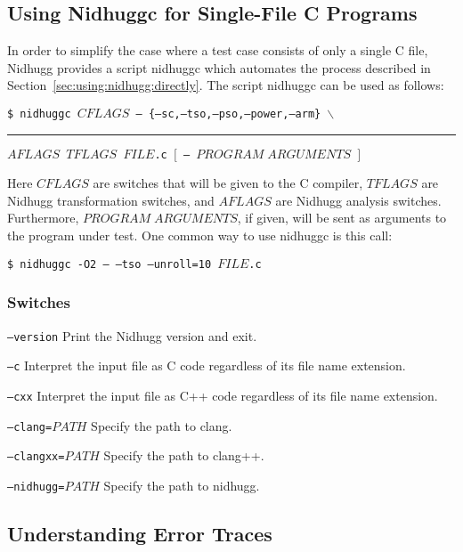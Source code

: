 \documentclass[a4paper]{article}
\begin{document}
\subsection{Using Nidhuggc for Single-File C Programs}\label{sec:using:nidhuggc}

In order to simplify the case where a test case consists of only a
single C file, Nidhugg provides a script \textsf{nidhuggc} which
automates the process described in
Section~\ref{sec:using:nidhugg:directly}. The script \textsf{nidhuggc}
can be used as follows:

\vspace{5pt}
\noindent
\texttt{\$ nidhuggc $CFLAGS$ -- \{--sc,--tso,--pso,--power,--arm\} $\backslash$}\\
\rule{20pt}{0pt}\texttt{$AFLAGS$ $TFLAGS$ $FILE$.c $[$ -- $PROGRAM\;ARGUMENTS$ $]$}

\vspace{5pt}\noindent
%
Here $CFLAGS$ are switches that will be given to the C compiler,
$TFLAGS$ are Nidhugg transformation switches, and $AFLAGS$ are Nidhugg
analysis switches. Furthermore, $PROGRAM\;ARGUMENTS$, if given, will
be sent as arguments to the program under test. One common way to use
\textsf{nidhuggc} is this call:

\vspace{5pt}
\noindent
\texttt{\$ nidhuggc -O2 -- --tso --unroll=10 $FILE$.c}

\subsubsection{Switches}

\begin{description}
\item{\texttt{--version}}
%
  Print the Nidhugg version and exit.
\item{\texttt{--c}}
%
  Interpret the input file as C code regardless of its file name
  extension.
\item{\texttt{--cxx}}
%
  Interpret the input file as C++ code regardless of its file name
  extension.
\item{\texttt{--clang=$PATH$}}
%
  Specify the path to \textsf{clang}.
\item{\texttt{--clangxx=$PATH$}}
%
  Specify the path to \textsf{clang++}.
\item{\texttt{--nidhugg=$PATH$}}
%
  Specify the path to \textsf{nidhugg}.
\end{description}

\subsection{Understanding Error Traces}\label{sec:understand:error:traces}
\end{document}
